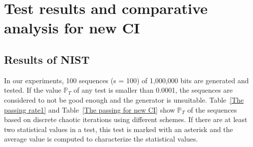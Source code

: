 \section{Test results and comparative analysis for new CI}

\subsection{Results of NIST}
\label{Results of NISTfor new CI}
In our experiments, 100 sequences (s = 100) of 1,000,000 bits are generated and tested. If the value $\mathbb{P}_T$ of any test is smaller than 0.0001, the sequences are considered to not be good enough and the generator is unsuitable. Table~\ref{The passing rate1} and Table~\ref{The passing for new CI} show $\mathbb{P}_T$ of the sequences based on discrete chaotic iterations using different schemes. If there are at least two statistical values in a test, this test is marked with an asterisk and the average value is computed to characterize the statistical values. 

